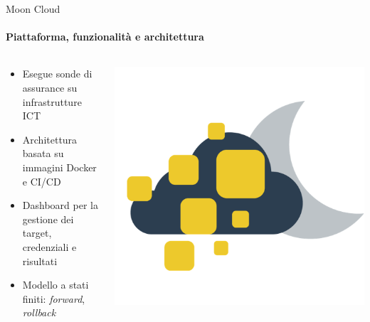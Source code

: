 \documentclass{beamer}
\begin{document}
\begin{frame}{Moon Cloud}
    \framesubtitle{Piattaforma, funzionalità e architettura}
    \begin{columns}
        \begin{column}{0.7\textwidth}
            \begin{itemize}
                \item<1-> Esegue sonde di assurance su infrastrutture ICT
                \item<2-> Architettura basata su immagini Docker e CI/CD
                \item<3-> Dashboard per la gestione dei target, credenziali e risultati
                \item<4-> Modello a stati finiti: \textit{forward}, \textit{rollback}
            \end{itemize}
        \end{column}
        \begin{column}{0.3\textwidth}
            \includegraphics[width=\textwidth]{assets/mooncloud.png}
        \end{column}
    \end{columns}
\end{frame}
\end{document}
